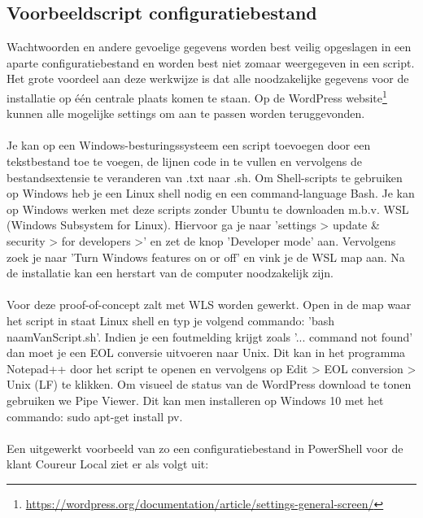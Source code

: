\subsection{Voorbeeldscript configuratiebestand}
Wachtwoorden en andere gevoelige gegevens worden best veilig opgeslagen in een aparte configuratiebestand en worden best niet zomaar weergegeven in een script. Het grote voordeel aan deze werkwijze is dat alle noodzakelijke gegevens voor de installatie op één centrale plaats komen te staan. Op de WordPress website\footnote{\href{https://wordpress.org/documentation/article/settings-general-screen/}{https://wordpress.org/documentation/article/settings-general-screen/}} kunnen alle mogelijke settings om aan te passen worden teruggevonden.
\\\\
Je kan op een Windows-besturingssysteem een script toevoegen door een tekstbestand toe te voegen, de lijnen code in te vullen en vervolgens de bestandsextensie te veranderen van .txt naar .sh. Om Shell-scripts te gebruiken op Windows heb je een Linux shell nodig en een command-language Bash. Je kan op Windows werken met deze scripts zonder Ubuntu te downloaden m.b.v. WSL (Windows Subsystem for Linux). Hiervoor ga je naar 'settings > update \& security > for developers >' en zet de knop 'Developer mode' aan. Vervolgens zoek je naar 'Turn Windows features on or off' en vink je de WSL map aan. Na de installatie kan een herstart van de computer noodzakelijk zijn. 
\\\\
Voor deze proof-of-concept zalt met WLS worden gewerkt. Open in de map waar het script in staat Linux shell en typ je volgend commando: 'bash naamVanScript.sh'. Indien je een foutmelding krijgt zoals '... command not found' dan moet je een EOL conversie uitvoeren naar Unix. Dit kan in het programma Notepad++ door het script te openen en vervolgens op Edit > EOL conversion > Unix (LF) te klikken. Om visueel de status van de WordPress download te tonen gebruiken we Pipe Viewer. Dit kan men installeren op Windows 10 met het commando: sudo apt-get install pv.
\\\\
Een uitgewerkt voorbeeld van zo een configuratiebestand in PowerShell voor de klant Coureur Local ziet er als volgt uit:
